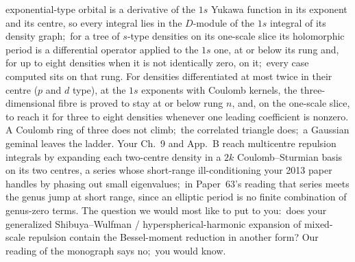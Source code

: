 \documentclass[11pt]{article}
\begin{document}
\begin{description}[style=nextline, leftmargin=1.2em]
exponential-type orbital is a derivative of the $1s$ Yukawa function in its
exponent and its centre, so every integral lies in the $D$-module of the $1s$
integral of its density graph;\ for a tree of $s$-type densities on its
one-scale slice its holomorphic period is a differential operator applied to
the $1s$ one, at or below its rung and, for up to eight densities when it
is not identically zero, on it;\ every case computed sits on that rung. For
densities differentiated at most twice in their centre ($p$ and $d$ type), at the
$1s$ exponents with Coulomb kernels, the three-dimensional fibre is proved to stay
at or below rung $n$, and, on the one-scale slice, to reach it for three to eight densities whenever one
leading coefficient is nonzero. A Coulomb ring of
three does not climb;\ the correlated triangle does;\ a Gaussian geminal
leaves the ladder. Your Ch.~9 and App.~B reach multicentre repulsion
integrals by expanding each two-centre density in a $2k$ Coulomb--Sturmian
basis on its two centres, a series whose short-range ill-conditioning your
2013 paper handles by phasing out small eigenvalues;\ in Paper~63's reading
that series meets the genus jump at short range, since an elliptic period is
no finite combination of genus-zero terms. The question we would most like to
put to you:\ does your generalized Shibuya--Wulfman / hyperspherical-harmonic
expansion of mixed-scale repulsion contain the Bessel-moment reduction in
another form? Our reading of the monograph says no;\ you would know.
\end{description}

\end{document}
